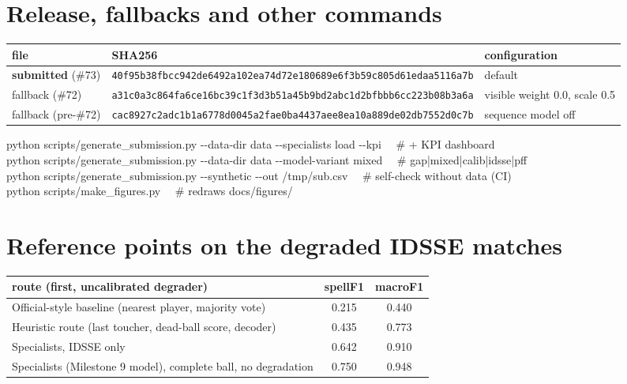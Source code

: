 \documentclass[10pt,a4paper]{article}
\begin{document}
\section{Release, fallbacks and other commands}
\begin{table}[H]\centering\footnotesize
\begin{tabular}{lll}
\toprule
file & SHA256 & configuration\\
\midrule
\textbf{submitted} (\#73) & \texttt{\scriptsize 40f95b38fbcc942de6492a102ea74d72e180689e6f3b59c805d61edaa5116a7b} & default\\
fallback (\#72) & \texttt{\scriptsize a31c0a3c864fa6ce16bc39c1f3d3b51a45b9bd2abc1d2bfbbb6cc223b08b3a6a} & visible weight 0.0, scale 0.5\\
fallback (pre-\#72) & \texttt{\scriptsize cac8927c2adc1b1a6778d0045a2fae0ba4437aee8ea10a889de02db7552d0c7b} & sequence model off\\
\bottomrule
\end{tabular}
\end{table}
\begin{tcolorbox}[colback=black!85,colupper=white,boxrule=0pt,arc=2pt,left=6pt,right=6pt]
\scriptsize\ttfamily
python scripts/generate\_submission.py -{}-data-dir data -{}-specialists load -{}-kpi \ \ \# + KPI dashboard\\
python scripts/generate\_submission.py -{}-data-dir data -{}-model-variant mixed \ \ \# gap|mixed|calib|idsse|pff\\
python scripts/generate\_submission.py -{}-synthetic -{}-out /tmp/sub.csv \ \ \# self-check without data (CI)\\
python scripts/make\_figures.py \ \ \# redraws docs/figures/
\end{tcolorbox}

\section{Reference points on the degraded IDSSE matches}
\begin{table}[H]\centering\small
\begin{tabular}{lcc}
\toprule
route (first, uncalibrated degrader) & spellF1 & macroF1\\
\midrule
Official-style baseline (nearest player, majority vote) & 0.215 & 0.440\\
Heuristic route (last toucher, dead-ball score, decoder) & 0.435 & 0.773\\
Specialists, IDSSE only & 0.642 & 0.910\\
Specialists (Milestone 9 model), complete ball, no degradation & 0.750 & 0.948\\
\bottomrule
\end{tabular}
\end{table}
\end{document}
